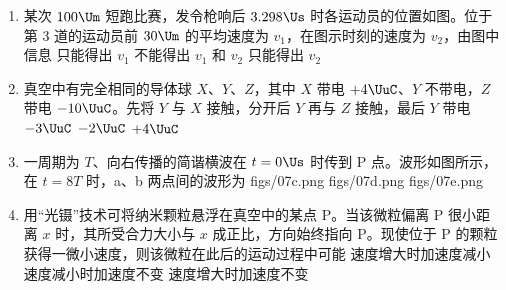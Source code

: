 \documentclass[\gkver]{gaokaozhenti}
\begin{document}
\begin{enumerate}
\item
某次 $100 \Um$ 短跑比赛，发令枪响后 $3.298 \Us$ 时各运动员的位置如图。位于第 3 道的运动员前 $30 \Um$ 的平均速度为 $v_{1}$，在图示时刻的速度为 $v_{2}$，由图中信息
\onepicture[align=right, w=5.40cm]{}
{只能得出 $v_{1}$}
{不能得出 $v_{1}$ 和 $v_{2}$}
{只能得出 $v_{2}$}

\item
真空中有完全相同的导体球 $X$、$Y$、$Z$，其中 $X$ 带电 $+4 \UuC$、$Y$ 不带电，$Z$ 带电 $-10 \UuC$。先将 $Y$ 与 $X$ 接触，分开后 $Y$ 再与 $Z$ 接触，最后 $Y$ 带电
\fourchoices[answer=A]
{$-4 \UuC$}
{$-3 \UuC$}
{$-2 \UuC$}
{$+4 \UuC$}

\item
一周期为 $T$、向右传播的简谐横波在 $t = 0 \Us$ 时传到 P 点。波形如图所示，在 $t = 8T$ 时，a、b 两点间的波形为
\onepicture[align=right, w=4.85cm]{}
{figs/07c.png}
{figs/07d.png}
{figs/07e.png}

\item
用“光镊”技术可将纳米颗粒悬浮在真空中的某点 P。当该微粒偏离 P 很小距离 $x$ 时，其所受合力大小与 $x$ 成正比，方向始终指向 P。现使位于 P 的颗粒获得一微小速度，则该微粒在此后的运动过程中可能
{速度增大时加速度减小}
{速度减小时加速度不变}
{速度增大时加速度不变}


\end{enumerate}
\end{document}

